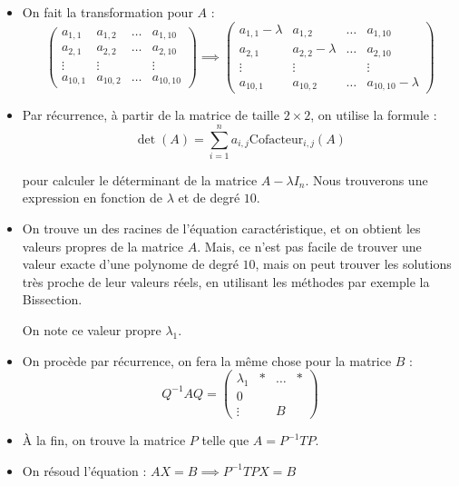 \documentclass{article}
\begin{document}
\begin{itemize}
    \item On fait la transformation pour $A$ :
        \[
            \begin{pmatrix} a_{1,1} & a_{1,2} & \ldots & a_{1,10} \\
                a_{2,1} & a_{2,2} & \ldots & a_{2,10} \\
                \vdots & \vdots & & \vdots\\
                a_{10,1} & a_{10,2} & \ldots & a_{10,10}
            \end{pmatrix} \implies 
            \begin{pmatrix} a_{1, 1} -\lambda & a_{1,2} & \ldots & a_{1,10} \\
                a_{2,1} & a_{2,2} -\lambda & \ldots & a_{2,10} \\
                \vdots & \vdots & & \vdots\\
                a_{10,1} & a_{10,2} & \ldots & a_{10,10} -\lambda
            \end{pmatrix} 
        \]
    \item Par récurrence, à partir de la matrice de taille $2\times 2$, on utilise la formule :
        \[
            \det(A) = \sum_{i=1}^n a_{i,j} \text{Cofacteur}_{i,j}(A)
        \]
        
        pour calculer le déterminant de la matrice $A-\lambda I_n$. Nous trouverons une expression en fonction de $\lambda$ et de degré  $10$.

    \item On trouve un des racines de l'équation caractéristique, et on obtient les valeurs propres de la matrice $A$. Mais, ce n'est pas facile de trouver une valeur exacte d'une polynome de degré $10$, mais on peut trouver les solutions très proche de leur valeurs réels, en utilisant les méthodes par exemple la Bissection.

        On note ce valeur propre $\lambda_1$.
    \item  On procède par récurrence, on fera la même chose pour la matrice $B$ :
        \[
            Q^{-1}A Q = \begin{pmatrix} \lambda_1 & * & \ldots & * \\
                0 & & \\
                \vdots & & B 
            \end{pmatrix}
        \]
        
    \item À la fin, on trouve la matrice $P$ telle que $A = P^{-1}TP$.
    \item On résoud l'équation : $AX = B \implies P^{-1}TPX =B$
\end{itemize}
\end{document}
